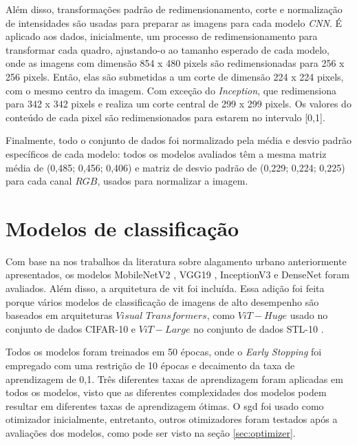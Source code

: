 Além disso, transformações padrão de redimensionamento, corte e normalização de intensidades são usadas para preparar as imagens para cada modelo \textit{CNN}.
É aplicado aos dados, inicialmente, um processo de redimensionamento para transformar cada quadro, ajustando-o ao tamanho esperado de cada modelo,
onde as imagens com dimensão 854 x 480 pixels são redimensionadas para 256 x 256 pixels.
Então, elas são submetidas a um corte de dimensão 224 x 224 pixels, com o mesmo centro da imagem.
Com exceção do \textit{Inception}, que redimensiona para 342 x 342 pixels e realiza um corte central de 299 x 299 pixels.
Os valores do conteúdo de cada pixel são redimensionados para estarem no intervalo [0,1].

Finalmente, todo o conjunto de dados foi normalizado pela média e desvio padrão específicos de cada modelo:
todos os modelos avaliados têm a mesma matriz média de (0,485; 0,456; 0,406) e matriz de desvio padrão de (0,229; 0,224; 0,225) para cada canal $RGB$, usados para normalizar a imagem.%

\section{Modelos de classificação}\label{sec:methodology_models}

Com base na nos trabalhos da literatura sobre alagamento urbano anteriormente apresentados, os modelos MobileNetV2 \cite{mobilenetv2}, VGG19 \cite{vgg}, InceptionV3 \cite{inception} e DenseNet \cite{densenet} foram avaliados.
Além disso, a arquitetura de \acrfull{vit}\cite{vit} foi incluída. Essa adição foi feita porque vários modelos de classificação de imagens de alto desempenho são baseados em arquiteturas $Visual$ $Transformers$, como $ViT-Huge$ usado no conjunto de dados CIFAR-10 \cite{dosovitskiy2021image} e $ViT-Large$ no conjunto de dados STL-10 \cite{gesmundo2022continual, kabir2023reduction}.

Todos os modelos foram treinados em 50 épocas, onde o \textit{Early Stopping} foi empregado com uma restrição de 10 épocas e decaimento da taxa de aprendizagem de 0,1. Três diferentes taxas de aprendizagem foram aplicadas em todos os modelos, visto que as diferentes complexidades dos modelos podem resultar em diferentes taxas de aprendizagem ótimas. O \acrfull{sgd} foi usado como otimizador inicialmente, entretanto, outros otimizadores foram testados após a avaliações dos modelos, como pode ser visto na seção \ref{sec:optimizer}.

